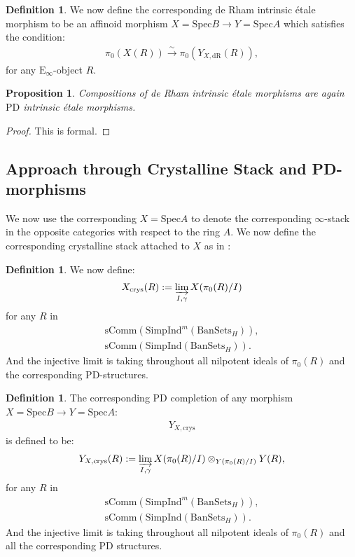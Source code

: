 \documentclass[12pt]{amsart}
\newtheorem{proposition}[theorem]{Proposition}
\theoremstyle{definition}
\newtheorem{definition}[theorem]{Definition}
\numberwithin{equation}{section}
\begin{document}
\begin{definition}
We now define the corresponding de Rham intrinsic \'etale morphism to be an affinoid morphism $X=\mathrm{Spec}B\rightarrow Y=\mathrm{Spec}A$ which satisfies the condition:
\begin{align}
\pi_0(X(R))\overset{\sim}{\rightarrow}	\pi_0(Y_{X,\mathrm{dR}}(R)),
\end{align}
for any $\mathrm{E}_\infty$-object $R$.	
\end{definition}

\begin{proposition}
Compositions of de Rham intrinsic \'etale morphisms are again $\mathrm{PD}$ intrinsic \'etale morphisms.
\end{proposition}

\begin{proof}
This is formal.	
\end{proof}


\subsection{Approach through Crystalline Stack and PD-morphisms}

\indent We now use the corresponding $X=\mathrm{Spec}A$ to denote the corresponding $\infty$-stack in the opposite categories with respect to the ring $A$. We now define the corresponding crystalline stack attached to $X$ as in \cite[Definition 1.1]{R}:


\begin{definition}
We now define:
\begin{align}
X_\mathrm{crys}(R):=\varinjlim_{I,\gamma} X(\pi_0(R)/I)	
\end{align}
for any $R$ in 
\begin{align}
\mathrm{sComm}(\mathrm{Simp}\mathrm{Ind}^m(\mathrm{BanSets}_{H})),\\
\mathrm{sComm}(\mathrm{Simp}\mathrm{Ind}(\mathrm{BanSets}_{H})).	
\end{align}
And the injective limit is taking throughout all nilpotent ideals of $\pi_0(R)$ and the corresponding PD-structures. 	
\end{definition}


\begin{definition}
The corresponding PD completion of any morphism $X=\mathrm{Spec}B\rightarrow Y=\mathrm{Spec}A$:
\begin{align}
Y_{X,\mathrm{crys}}	
\end{align}
is defined to be:
\begin{align}
Y_{X,\mathrm{crys}}(R):=\varinjlim_{I,\gamma} X(\pi_0(R)/I)\otimes_{Y(\pi_0(R)/I)}	Y(R),
\end{align}
for any $R$ in 
\begin{align}
\mathrm{sComm}(\mathrm{Simp}\mathrm{Ind}^m(\mathrm{BanSets}_{H})),\\
\mathrm{sComm}(\mathrm{Simp}\mathrm{Ind}(\mathrm{BanSets}_{H})).	
\end{align}
And the injective limit is taking throughout all nilpotent ideals of $\pi_0(R)$ and all the corresponding PD structures.	
\end{definition}
\end{document}
